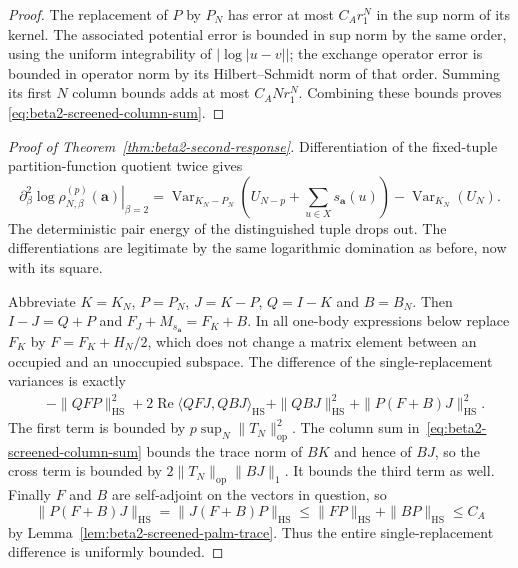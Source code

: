 \documentclass[11pt,a4paper]{article}
\numberwithin{equation}{section}
\theoremstyle{definition}
\theoremstyle{remark}
\DeclareMathOperator{\Var}{Var}
\begin{document}
\begin{proof}
The replacement of $P$ by $P_N$ has error at most $C_A r_1^N$
in the sup norm of its kernel.  The associated potential error
is bounded in sup norm by the same order, using the uniform
integrability of $|\log|u-v||$; the exchange operator error is
bounded in operator norm by its Hilbert--Schmidt norm of that
order.  Summing its first $N$ column bounds adds at most
$C_A N r_1^N$.  Combining these bounds proves
\eqref{eq:beta2-screened-column-sum}.
\end{proof}

\begin{proof}[Proof of Theorem~\ref{thm:beta2-second-response}]
Differentiation of the fixed-tuple partition-function quotient
twice gives
\[
 \left.\partial_\beta^2\log\rho_{N,\beta}^{(p)}(\mathbf a)
 \right|_{\beta=2}
 =\Var_{K_N-P_N}\left(U_{N-p}+\sum_{u\in X}s_{\mathbf a}(u)\right)
       -\Var_{K_N}(U_N).
\]
The deterministic pair energy of the distinguished tuple drops
out.  The differentiations are legitimate by the same logarithmic
domination as before, now with its square.

Abbreviate $K=K_N$, $P=P_N$, $J=K-P$, $Q=I-K$ and $B=B_N$.
Then $I-J=Q+P$ and
$F_J+M_{s_{\mathbf a}}=F_K+B$.  In all one-body expressions below
replace $F_K$ by $F=F_K+H_N/2$, which does not change a matrix
element between an occupied and an unoccupied subspace.
The difference of the single-replacement variances is exactly
\begin{align*}
 &-\|QFP\|_{\mathrm{HS}}^2
 +2\operatorname{Re}\langle QFJ,QBJ\rangle_{\mathrm{HS}}
 +\|QBJ\|_{\mathrm{HS}}^2
 +\|P(F+B)J\|_{\mathrm{HS}}^2.
\end{align*}
The first term is bounded by $p\sup_N\|T_N\|_{\mathrm{op}}^2$.
The column sum in~\eqref{eq:beta2-screened-column-sum} bounds the
trace norm of $BK$ and hence of $BJ$, so the cross term is bounded
by $2\|T_N\|_{\mathrm{op}}\|BJ\|_1$.  It bounds the third term
as well.  Finally $F$ and $B$ are self-adjoint on the vectors
in question, so
\[
 \|P(F+B)J\|_{\mathrm{HS}}
 =\|J(F+B)P\|_{\mathrm{HS}}
 \le\|FP\|_{\mathrm{HS}}+\|BP\|_{\mathrm{HS}}\le C_A
\]
by Lemma~\ref{lem:beta2-screened-palm-trace}.  Thus the entire
single-replacement difference is uniformly bounded.


\end{proof}
\end{document}
